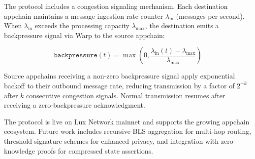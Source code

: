 \documentclass[11pt,a4paper]{article}
\begin{document}
The protocol includes a congestion signaling mechanism. Each destination appchain maintains a message ingestion rate counter $\lambda_{\text{in}}$ (messages per second). When $\lambda_{\text{in}}$ exceeds the processing capacity $\lambda_{\max}$, the destination emits a backpressure signal via Warp to the source appchain:

\begin{equation}
    \texttt{backpressure}(t) = \max\!\left(0, \frac{\lambda_{\text{in}}(t) - \lambda_{\max}}{\lambda_{\max}}\right)
\end{equation}

Source appchains receiving a non-zero backpressure signal apply exponential backoff to their outbound message rate, reducing transmission by a factor of $2^{-k}$ after $k$ consecutive congestion signals. Normal transmission resumes after receiving a zero-backpressure acknowledgment.

The protocol is live on Lux Network mainnet and supports the growing appchain ecosystem. Future work includes recursive BLS aggregation for multi-hop routing, threshold signature schemes for enhanced privacy, and integration with zero-knowledge proofs for compressed state assertions.
\end{document}

